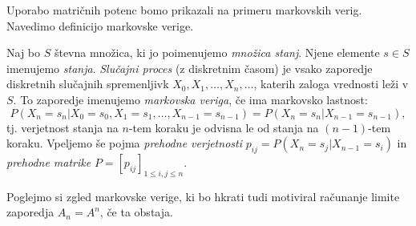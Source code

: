 \documentclass[mat1]{fmfdelo}
\begin{document}
Uporabo matričnih potenc bomo prikazali na primeru markovskih verig. Navedimo definicijo markovske verige.
\begin{definicija}
    Naj bo $S$ števna množica, ki jo poimenujemo \emph{množica stanj}. Njene elemente $s \in S$ imenujemo \emph{stanja}. \emph{Slučajni proces} (z diskretnim časom) je vsako zaporedje diskretnih slučajnih spremenljivk $X_0, X_1, \ldots, X_n, \ldots$, katerih zaloga vrednosti leži v $S$. To zaporedje imenujemo \emph{markovska veriga}, če ima markovsko lastnost:
    \begin{equation*}
        P(X_n = s_n | X_0 = s_0, X_1 = s_1, \ldots, X_{n-1} = s_{n-1}) = P(X_n = s_n | X_{n-1} = s_{n-1}),
    \end{equation*}
    tj. verjetnost stanja na $n$-tem koraku je odvisna le od stanja na $(n-1)$-tem koraku. Vpeljemo še pojma \emph{prehodne verjetnosti} $p_{ij} = P(X_n = s_j | X_{n-1} = s_i)$ in \emph{prehodne matrike} $P = [p_{ij}]_{1 \leq i,j \leq n}$.
\end{definicija}
Poglejmo si zgled markovske verige, ki bo hkrati tudi motiviral računanje limite zaporedja $A_n = A^n$, če ta obstaja. 
\end{document}
